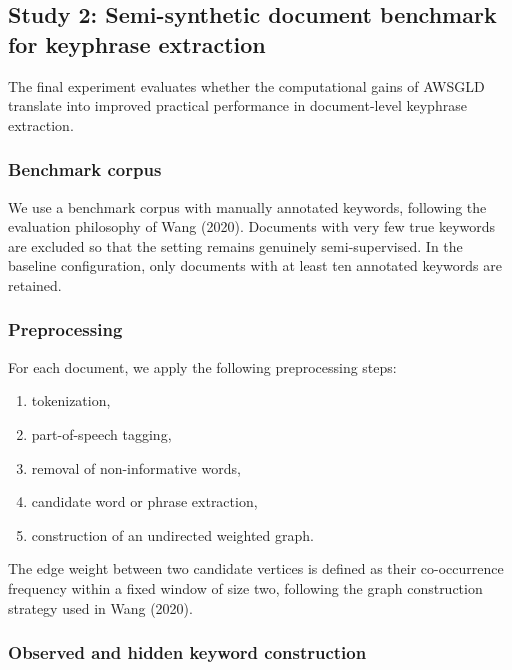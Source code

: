 \documentclass[11pt]{article}
\begin{document}
\subsection{Study 2: Semi-synthetic document benchmark for keyphrase extraction}
\label{subsec:sim_benchmark}

The final experiment evaluates whether the computational gains of AWSGLD translate into improved practical performance in document-level keyphrase extraction.

\subsubsection{Benchmark corpus}

We use a benchmark corpus with manually annotated keywords, following the evaluation philosophy of Wang (2020). Documents with very few true keywords are excluded so that the setting remains genuinely semi-supervised. In the baseline configuration, only documents with at least ten annotated keywords are retained.

\subsubsection{Preprocessing}

For each document, we apply the following preprocessing steps:
\begin{enumerate}
    \item tokenization,
    \item part-of-speech tagging,
    \item removal of non-informative words,
    \item candidate word or phrase extraction,
    \item construction of an undirected weighted graph.
\end{enumerate}
The edge weight between two candidate vertices is defined as their co-occurrence frequency within a fixed window of size two, following the graph construction strategy used in Wang (2020).

\subsubsection{Observed and hidden keyword construction}
\end{document}
